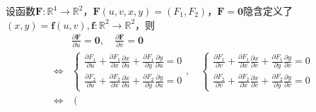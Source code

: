 \documentclass[../main.tex]{subfiles}
\begin{document}
\begin{example}\label{exp:II.12.2}
    设函数$\mathbf{F}:\mathbb{R}^4\rightarrow\mathbb{R}^2$，$\mathbf{F}\left(u,v,x,y\right)=\left(F_1,F_2\right)$，$\mathbf{F}=\mathbf{0}$隐含定义了$\left(x,y\right)=\mathbf{f}\left(u,v\right),\mathbf{f}:\mathbb{R}^2\rightarrow\mathbb{R}^2$，则
    \begin{align*}
                        & \frac{\partial \mathbf{F}}{\partial u}=\mathbf{0},\quad\frac{\partial \mathbf{F}}{\partial v}=\mathbf{0}                                                                                                                                                                                                                                                                                                                                                                         \\
        \Leftrightarrow & \left\{\begin{array}{l}
                                     \frac{\partial F_1}{\partial u}+\frac{\partial F_1}{\partial x}\frac{\partial x}{\partial u}+\frac{\partial F_1}{\partial y}\frac{\partial y}{\partial u}=0 \\
                                     \frac{\partial F_2}{\partial u}+\frac{\partial F_2}{\partial x}\frac{\partial x}{\partial u}+\frac{\partial F_2}{\partial y}\frac{\partial y}{\partial u}=0
                                 \end{array}\right.,\quad\left\{\begin{array}{l}
                                                                    \frac{\partial F_1}{\partial v}+\frac{\partial F_1}{\partial x}\frac{\partial x}{\partial v}+\frac{\partial F_1}{\partial y}\frac{\partial y}{\partial v}=0 \\
                                                                    \frac{\partial F_2}{\partial v}+\frac{\partial F_2}{\partial x}\frac{\partial x}{\partial v}+\frac{\partial F_2}{\partial y}\frac{\partial y}{\partial v}=0
                                                                \end{array}\right.                                                                                                                                                                                                                                                                                \\
        \Leftrightarrow & \left(\begin{array}{cc}

\end{array}
\end{align*}
\end{example}
\end{document}
